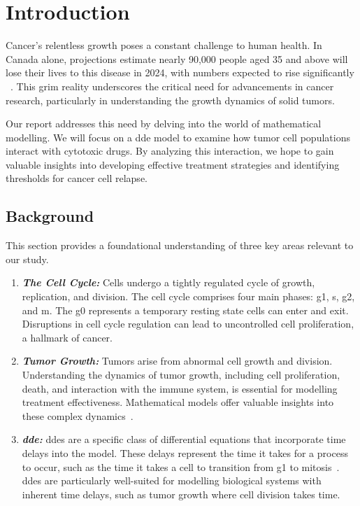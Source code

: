\chapter{Introduction}

Cancer's relentless growth poses a constant challenge to human health. In Canada alone, projections estimate nearly 90,000 people aged 35 and above will lose their lives to this disease in 2024, with numbers expected to rise significantly ~\cite{Pader2021}. This grim reality underscores the critical need for advancements in cancer research, particularly in understanding the growth dynamics of solid tumors.

Our report addresses this need by delving into the world of mathematical modelling.  We will focus on a \gls{dde} model to examine how tumor cell populations interact with \gls{cytotoxic} drugs.  By analyzing this interaction, we hope to gain valuable insights into developing effective treatment strategies and identifying thresholds for cancer cell \gls{relapse}.


\section{Background}

This section provides a foundational understanding of three key areas relevant to our study.

\begin{enumerate}
    \item \textbf{\textit{The Cell Cycle:}} Cells undergo a tightly regulated cycle of growth, replication, and division. The cell cycle comprises four main phases: \gls{g1}, \gls{s}, \gls{g2}, and \gls{m}. The \gls{g0} represents a temporary resting state cells can enter and exit. Disruptions in cell cycle regulation can lead to uncontrolled cell proliferation, a hallmark of cancer.
    \item \textbf{\textit{Tumor Growth:}} Tumors arise from abnormal cell growth and division. Understanding the dynamics of tumor growth, including cell proliferation, death, and interaction with the immune system, is essential for modelling treatment effectiveness. Mathematical models offer valuable insights into these complex dynamics~\cite{Busenberg2012}.
    \item \textbf{\textit{\gls{dde}:}} \gls{dde}s are a specific class of differential equations that incorporate time delays into the model. These delays represent the time it takes for a process to occur, such as the time it takes a cell to transition from \gls{g1} to mitosis~\cite{Niculescu2021}. \gls{dde}s are particularly well-suited for modelling biological systems with inherent time delays, such as tumor growth where cell division takes time.
\end{enumerate}

